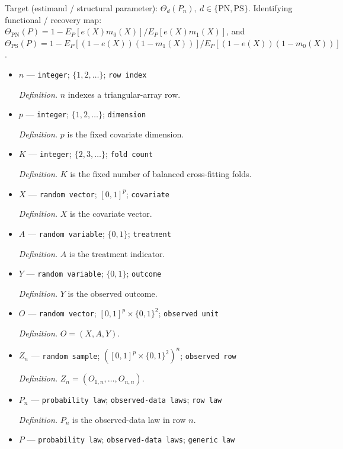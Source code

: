 \documentclass{article}
\begin{document}
Target (estimand / structural parameter): \(\Theta_d(P_n),\ d\in\{\mathrm{PN},\mathrm{PS}\}\).
Identifying functional / recovery map: \(\Theta_{\mathrm{PN}}(P)=1-E_P[e(X)m_0(X)]/E_P[e(X)m_1(X)]\), and \(\Theta_{\mathrm{PS}}(P)=1-E_P[(1-e(X))(1-m_1(X))]/E_P[(1-e(X))(1-m_0(X))]\).
\begin{itemize}
  \item \(n\) --- \texttt{integer}; \(\{1,2,\ldots\}\); \texttt{row index}
  \par\smallskip\noindent\emph{Definition.} \(n\) indexes a triangular-array row.
  \item \(p\) --- \texttt{integer}; \(\{1,2,\ldots\}\); \texttt{dimension}
  \par\smallskip\noindent\emph{Definition.} \(p\) is the fixed covariate dimension.
  \item \(K\) --- \texttt{integer}; \(\{2,3,\ldots\}\); \texttt{fold count}
  \par\smallskip\noindent\emph{Definition.} \(K\) is the fixed number of balanced cross-fitting folds.
  \item \(X\) --- \texttt{random vector}; \([0,1]^p\); \texttt{covariate}
  \par\smallskip\noindent\emph{Definition.} \(X\) is the covariate vector.
  \item \(A\) --- \texttt{random variable}; \(\{0,1\}\); \texttt{treatment}
  \par\smallskip\noindent\emph{Definition.} \(A\) is the treatment indicator.
  \item \(Y\) --- \texttt{random variable}; \(\{0,1\}\); \texttt{outcome}
  \par\smallskip\noindent\emph{Definition.} \(Y\) is the observed outcome.
  \item \(O\) --- \texttt{random vector}; \([0,1]^p\times\{0,1\}^2\); \texttt{observed unit}
  \par\smallskip\noindent\emph{Definition.} \(O=(X,A,Y)\).
  \item \(Z_n\) --- \texttt{random sample}; \(([0,1]^p\times\{0,1\}^2)^n\); \texttt{observed row}
  \par\smallskip\noindent\emph{Definition.} \(Z_n=(O_{1,n},\ldots,O_{n,n})\).
  \item \(P_n\) --- \texttt{probability law}; \texttt{observed-\allowbreak{}data laws}; \texttt{row law}
  \par\smallskip\noindent\emph{Definition.} \(P_n\) is the observed-data law in row \(n\).
  \item \(P\) --- \texttt{probability law}; \texttt{observed-\allowbreak{}data laws}; \texttt{generic law}

\end{itemize}
\end{document}
